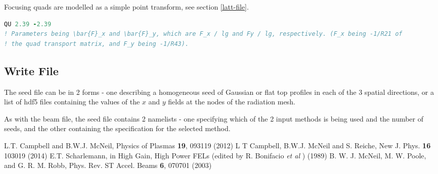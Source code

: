 \documentclass[12pt]{article}%
\begin{document}
Focusing quads are modelled as a simple point transform, see section \ref{latt-file}.

\begin{lstlisting}[language=fortran, caption=Quadrupole identifier and specification]
QU 2.39 -2.39
! Parameters being \bar{F}_x and \bar{F}_y, which are F_x / lg and Fy / lg, respectively. (F_x being -1/R21 of
! the quad transport matrix, and F_y being -1/R43).

\end{lstlisting}




\newpage

\subsection{Write File}

The seed file can be in 2 forms - one describing a homogeneous seed of Gaussian or flat top profiles in each of the 3 spatial directions, or a list of hdf5 files containing the values of the $x$ and $y$ fields at the nodes of the radiation mesh.

As with the beam file, the seed file contains 2 namelists - one specifying which of the 2 input methods is being used and the number of seeds, and the other containing the specification for the selected method.



\newpage

\begin{thebibliography}{10}

L.T. Campbell and B.W.J. McNeil, Physics of Plasmas {\bf 19}, 093119 (2012)
L T Campbell, B.W.J. McNeil and S. Reiche, New J. Phys. {\bf 16} 103019 (2014)
E.T. Scharlemann, in High Gain, High Power FELs (edited by R. Bonifacio \textit{et al} ) (1989)
B. W. J. McNeil, M. W. Poole, and G. R. M. Robb, Phys. Rev. ST Accel. Beams {\bf 6}, 070701 (2003)


\end{thebibliography}
\end{document}
